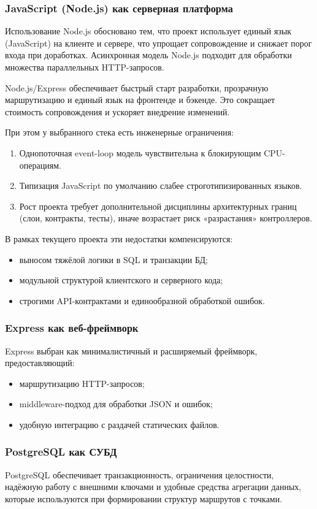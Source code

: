 \subsubsection{JavaScript (Node.js) как серверная платформа}
Использование Node.js обосновано тем, что проект использует единый язык
(JavaScript) на клиенте и сервере, что упрощает сопровождение и снижает
порог входа при доработках. Асинхронная модель Node.js подходит для
обработки множества параллельных HTTP-запросов.

Node.js/Express обеспечивает быстрый старт разработки, прозрачную маршрутизацию
и единый язык на фронтенде и бэкенде. Это сокращает стоимость сопровождения и
ускоряет внедрение изменений.

При этом у выбранного стека есть инженерные ограничения:
\begin{enumerate}
	\item Однопоточная event-loop модель чувствительна к блокирующим CPU-операциям.
	\item Типизация JavaScript по умолчанию слабее строготипизированных языков.
	\item Рост проекта требует дополнительной дисциплины архитектурных границ
	(слои, контракты, тесты), иначе возрастает риск «разрастания» контроллеров.
\end{enumerate}

В рамках текущего проекта эти недостатки компенсируются:
\begin{itemize}
	\item выносом тяжёлой логики в SQL и транзакции БД;
	\item модульной структурой клиентского и серверного кода;
	\item строгими API-контрактами и единообразной обработкой ошибок.
\end{itemize}

\subsubsection{Express как веб-фреймворк}
Express выбран как минималистичный и расширяемый фреймворк,
предоставляющий:
\begin{itemize}
	\item маршрутизацию HTTP-запросов;
	\item middleware-подход для обработки JSON и ошибок;
	\item удобную интеграцию с раздачей статических файлов.
\end{itemize}

\subsubsection{PostgreSQL как СУБД}
PostgreSQL обеспечивает транзакционность, ограничения целостности,
надёжную работу с внешними ключами и удобные средства агрегации данных,
которые используются при формировании структур маршрутов с точками.

